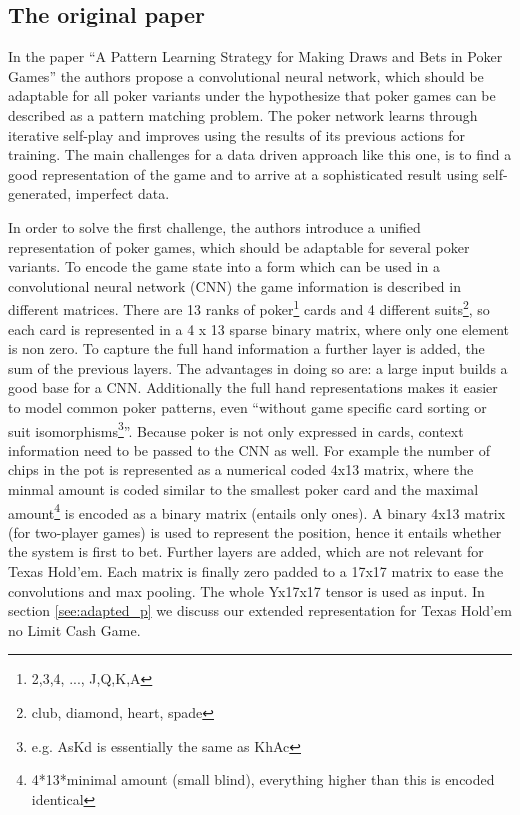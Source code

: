 \documentclass[]{report}
\begin{document}
\subsection{The original paper}

In the paper ``A Pattern Learning Strategy for Making Draws and Bets
in Poker Games''\cite{1} the authors propose a convolutional neural
network, which should be adaptable for all poker variants under the
hypothesize that poker games can be described as a pattern matching
problem. The poker network learns through iterative self-play and
improves using the results of its previous actions for training. The
main challenges for a data driven approach like this one, is to find
a good representation of the game and to arrive at a sophisticated result using self-generated,
imperfect data.

In order to solve the first challenge, the authors introduce a unified
representation of poker games, which should be adaptable for several poker variants. To encode the game state into a form
which can be used in a convolutional neural network (CNN) the game information
is described in different matrices. There are 13 ranks of poker\footnote{2,3,4, ..., J,Q,K,A}
cards and 4 different suits\footnote{club, diamond, heart, spade},
so each card is represented in a 4 x 13 sparse binary matrix, where
only one element is non zero. To capture the full hand information
a further layer is added, the sum of the previous layers. The advantages
in doing so are: a large input builds a good base for a CNN. Additionally the
full hand representations makes it easier to model common poker patterns, even
``without game specific card sorting or suit isomorphisms\footnote{e.g. AsKd
is essentially the same as KhAc}''.\cite{1} Because poker is not
only expressed in cards, context information need to be passed to
the CNN as well. For example the number of chips in the pot is represented
as a numerical coded 4x13 matrix, where the minmal amount is coded
similar to the smallest poker card and the maximal amount\footnote{4{*}13{*}minimal amount (small blind), everything higher than this
is encoded identical} is encoded as a binary matrix (entails only ones). A binary 4x13
matrix (for two-player games) is used to represent the position, hence
it entails whether the system is first to bet. Further layers are
added, which are not relevant for Texas Hold'em. Each matrix is finally
zero padded to a 17x17 matrix to ease the convolutions and max pooling.
The whole Yx17x17 tensor is used as input. In section \ref{see:adapted_p}
we discuss our extended representation for Texas Hold'em no Limit
Cash Game.
\end{document}
